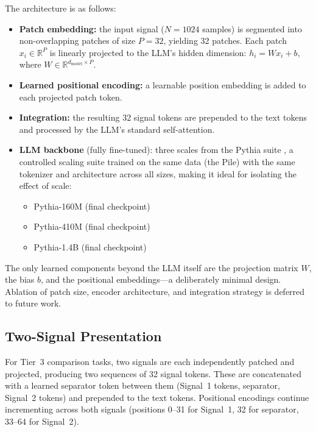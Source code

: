 \documentclass[11pt]{article}
\begin{document}
The architecture is as follows:
\begin{itemize}[nosep]
    \item \textbf{Patch embedding:} the input signal ($N = 1024$ samples) is segmented into non-overlapping patches of size $P = 32$, yielding 32 patches. Each patch $x_i \in \mathbb{R}^P$ is linearly projected to the LLM's hidden dimension: $h_i = Wx_i + b$, where $W \in \mathbb{R}^{d_\text{model} \times P}$.
    \item \textbf{Learned positional encoding:} a learnable position embedding is added to each projected patch token.
    \item \textbf{Integration:} the resulting 32 signal tokens are prepended to the text tokens and processed by the LLM's standard self-attention.
    \item \textbf{LLM backbone} (fully fine-tuned): three scales from the Pythia suite \citep{biderman2023pythia}, a controlled scaling suite trained on the same data (the Pile) with the same tokenizer and architecture across all sizes, making it ideal for isolating the effect of scale:
    \begin{itemize}[nosep]
        \item Pythia-160M (final checkpoint)
        \item Pythia-410M (final checkpoint)
        \item Pythia-1.4B (final checkpoint)
    \end{itemize}
\end{itemize}

The only learned components beyond the LLM itself are the projection matrix $W$, the bias $b$, and the positional embeddings---a deliberately minimal design. Ablation of patch size, encoder architecture, and integration strategy is deferred to future work.

\subsection{Two-Signal Presentation}
\label{sec:twosig}

For Tier~3 comparison tasks, two signals are each independently patched and projected, producing two sequences of 32 signal tokens. These are concatenated with a learned separator token between them (Signal~1 tokens, separator, Signal~2 tokens) and prepended to the text tokens. Positional encodings continue incrementing across both signals (positions 0--31 for Signal~1, 32 for separator, 33--64 for Signal~2).
\end{document}
